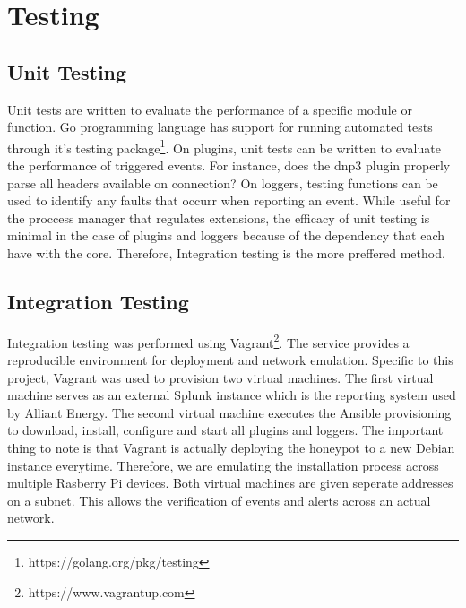 \chapter{Testing}
\section{Unit Testing}

Unit tests are written to evaluate the performance of a specific module or function. Go programming language has support for running automated tests through it's testing package\footnote{https://golang.org/pkg/testing}. On plugins, unit tests can be written to evaluate the performance of triggered events. For instance, does the dnp3 plugin properly parse all headers available on connection? On loggers, testing functions can be used to identify any faults that occurr when reporting an event. While useful for the proccess manager that regulates extensions, the efficacy of unit testing is minimal in the case of plugins and loggers because of the dependency that each have with the core. Therefore, Integration testing is the more preffered method. 


\section{Integration Testing}

Integration testing was performed using Vagrant\footnote{https://www.vagrantup.com}. The service provides a reproducible environment for deployment and network emulation. Specific to this project, Vagrant was used to provision two virtual machines. The first virtual machine serves as an external Splunk instance which is the reporting system used by Alliant Energy. The second virtual machine executes the Ansible provisioning to download, install, configure and start all plugins and loggers. The important thing to note is that Vagrant is actually deploying the honeypot to a new Debian instance everytime. Therefore, we are emulating the installation process across multiple Rasberry Pi devices. Both virtual machines are given seperate addresses on a subnet. This allows the verification of events and alerts across an actual network.
